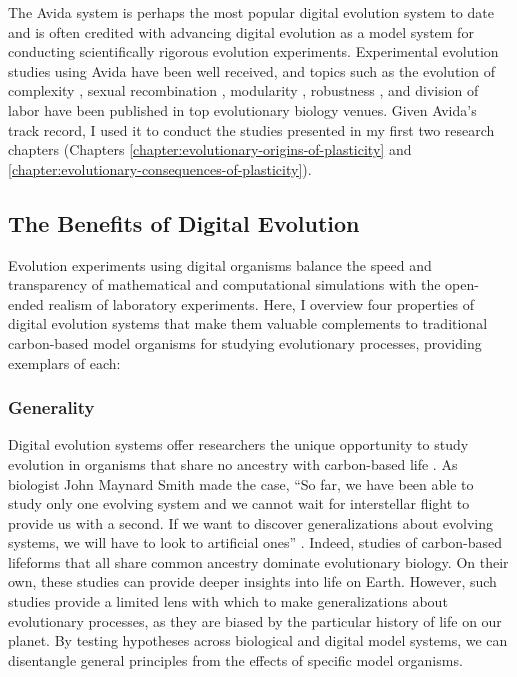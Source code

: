 The Avida system is perhaps the most popular digital evolution system to date and is often credited with advancing digital evolution as a model system for conducting scientifically rigorous evolution experiments.
Experimental evolution studies using Avida have been well received, and topics such as the evolution of complexity \citep{adami_evolution_2000,lenski_evolutionary_2003}, sexual recombination \citep{misevic_experiments_2010}, modularity \citep{misevic_sexual_2006}, robustness \citep{lenski_genome_1999,elena_effects_2007}, and division of labor \citep{goldsby_task-switching_2012,goldsby_evolutionary_2014} have been published in top evolutionary biology venues.
Given Avida's track record, I used it to conduct the studies presented in my first two research chapters (Chapters \ref{chapter:evolutionary-origins-of-plasticity} and \ref{chapter:evolutionary-consequences-of-plasticity}).

\subsection{The Benefits of Digital Evolution}

Evolution experiments using digital organisms balance the speed and transparency of mathematical and computational simulations with the open-ended realism of laboratory experiments. 
Here, I overview four properties of digital evolution systems that make them valuable complements to traditional carbon-based model organisms for studying evolutionary processes, providing exemplars of each:

\subsubsection{Generality}

Digital evolution systems offer researchers the unique opportunity to study evolution in organisms that share no ancestry with carbon-based life \citep{wilke_biology_2002}.
As biologist John Maynard Smith made the case, ``So far, we have been able to study only one evolving system and we cannot wait for interstellar flight to provide us with a second. If we want to discover generalizations about evolving systems, we will have to look to artificial ones'' \citep{maynard_smith_byte-sized_1992}.
Indeed, studies of carbon-based lifeforms that all share common ancestry dominate evolutionary biology.
On their own, these studies can provide deeper insights into life on Earth. 
However, such studies provide a limited lens with which to make generalizations about evolutionary processes, as they are biased by the particular history of life on our planet.
By testing hypotheses across biological and digital model systems, we can disentangle general principles from the effects of specific model organisms.  

